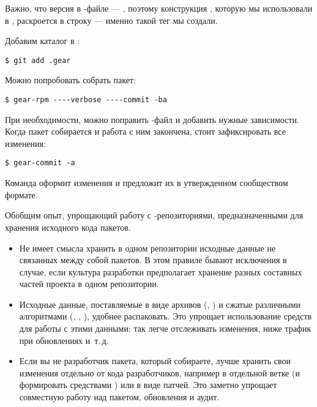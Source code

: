 Важно, что версия в -файле --- , поэтому конструкция ,
которую мы использовали в , раскроется в строку  ---
именно такой тег  мы создали.

Добавим каталог  в :
\begin{verbatim}
$ git add .gear
\end{verbatim}

Можно попробовать собрать пакет:
\begin{verbatim}
$ gear-rpm ----verbose ----commit -ba
\end{verbatim}

При необходимости, можно поправить -файл и добавить нужные зависимости.
Когда пакет собирается и работа с ним закончена, стоит зафиксировать все изменения:
\begin{verbatim}
$ gear-commit -a
\end{verbatim}
Команда оформит изменения и предложит их в утвержденном сообществом формате.

Обобщим опыт, упрощающий работу с -репозиториями, предназначенными для хранения исходного кода пакетов.

\begin{itemize}
	\item {}

	Не имеет смысла хранить в одном репозитории исходные данные не связанных между собой пакетов.
		В этом правиле бывают исключения в случае, если культура разработки предполагает хранение
		разных составных частей проекта в одном репозитории.
	\item  {}

	Исходные данные, поставляемые в виде архивов (, ) и сжатые различными
		алгоритмами (, , ), удобнее распаковать. Это упрощает
		использование средств  для работы с этими данными: так легче отслеживать изменения,
		ниже трафик при обновлениях и~т.\,д.
	\item {}

	Если вы не разработчик пакета, который собираете, лучше хранить свои изменения отдельно
		от кода разработчиков, например в отдельной ветке (и формировать  средствами )
		или в виде патчей. Это заметно упрощает совместную работу над пакетом, обновления и аудит.
\end{itemize}
